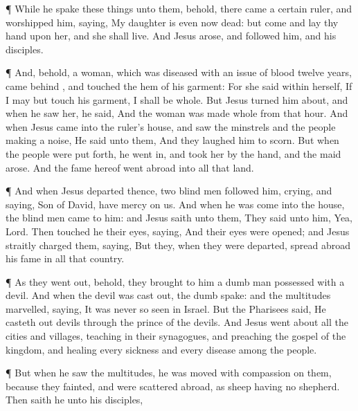 {\par }{\PP {}¶
While
he
spake these
things unto
them,
behold, there
came a certain
ruler,
and
worshipped
him,
saying,
My
daughter
is even
now
dead:
but come
and
lay
thy
hand
upon
her,
and she shall
live.
And
Jesus arose,
and
followed
him,
and
{}
his
disciples.
\par }{\PP {}¶
And,
behold, a
woman, which was diseased with an issue of
blood
twelve
years,
came
behind
{}, and
touched the
hem
of
his
garment:
For she
said
within
herself,
If I
may
but
touch
his
garment, I shall be
whole.
But
Jesus turned him
about,
and when he
saw
her, he
said,
{}
And the
woman was made
whole
from
that
hour.
And
when
Jesus
came
into the
ruler’s
house,
and
saw the
minstrels
and the
people making a
noise,
He
said unto
them,
{}
And they
laughed
him to
scorn.
But
when the
people were put
forth, he went in,
and
took
her by the
hand,
and the
maid
arose.
And the
fame
hereof went
abroad
into
all
that
land.
\par }{\PP {}¶
And
when
Jesus
departed
thence,
two blind
men
followed
him,
crying,
and
saying,
{}
Son of
David, have mercy
on
us.
And when he was
come
into the
house, the blind
men
came to
him:
and
Jesus
saith unto
them,
{} They
said unto
him,
Yea,
Lord.
Then touched
he
their
eyes,
saying,
{}
And
their
eyes were
opened;
and
Jesus straitly
charged
them,
saying,
{}
But
they, when they were
departed, spread
abroad
his
fame
in
all
that
country.
\par }{\PP {}¶
As
they went
out,
behold, they
brought to
him a
dumb
man possessed with a
devil.
And
when the
devil was cast
out, the
dumb
spake:
and the
multitudes
marvelled,
saying, It
was
never
so
seen
in
Israel.
But the
Pharisees
said, He casteth
out
devils
through the
prince of the
devils.
And
Jesus went
about
all the
cities
and
villages,
teaching
in
their
synagogues,
and
preaching the
gospel of the
kingdom,
and
healing
every
sickness
and
every
disease
among the
people.
\par }{\PP {}¶
But when he
saw the
multitudes, he was moved with
compassion
on
them,
because
they
fainted,
and
were scattered
abroad,
as
sheep
having
no
shepherd.
Then saith
he
unto
his
disciples,
{}

}
